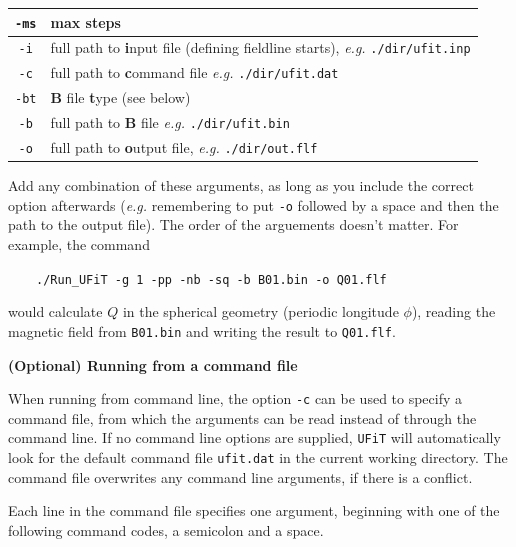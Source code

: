 \documentclass[12pt,twoside]{article}
\begin{document}
\begin{tabular}{|c|l|}
		\texttt{-ms} & \textbf{m}ax \textbf{s}teps  \\\hline
		\texttt{-i} & full path to \textbf{i}nput file (defining fieldline starts), \textit{e.g.} \texttt{./dir/ufit.inp} \\\hline
		\texttt{-c} & full path to \textbf{c}ommand file \textit{e.g.} \texttt{./dir/ufit.dat} \\\hline
		\texttt{-bt} & $\mathbf{B}$ file \textbf{t}ype (see below) \\\hline
		\texttt{-b} & full path to $\mathbf{B}$ file \textit{e.g.} \texttt{./dir/ufit.bin} \\\hline
		\texttt{-o} & full path to \textbf{o}utput file, \textit{e.g.} \texttt{./dir/out.flf} \\\hline

\end{tabular}

\vspace{2mm}

Add any combination of these arguments, as long as you include the correct option afterwards (\textit{e.g.} remembering to put \texttt{-o} followed by a space and then the path to the output file). The order of the arguements doesn't matter. For example, the command

$\quad\quad$\texttt{./Run\_UFiT -g 1 -pp -nb -sq -b B01.bin -o Q01.flf}

would calculate $Q$ in the spherical geometry (periodic longitude $\phi$), reading the magnetic field from \texttt{B01.bin} and writing the result to \texttt{Q01.flf}.


\vspace{2mm}
{\Large \textbf{(Optional) Running from a command file}}

When running from command line, the option \texttt{-c} can be used to specify a command file, from which the arguments can be read instead of through the command line. If no command line options are supplied, \texttt{UFiT} will automatically look for the default command file \texttt{ufit.dat} in the current working directory. The command file overwrites any command line arguments, if there is a conflict.

Each line in the command file specifies one argument, beginning with one of the following command codes, a semicolon and a space.
\end{document}
